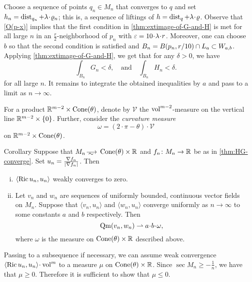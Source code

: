 Choose a sequence of points $q_n\in M_n$ that converges to $q$ and set $h_n\zz=\dist_{q_n}+\lambda\cdot \rho_n$;
this is, a sequence of liftings of $h=\dist_q+\lambda\cdot \rho$. 
Observe that \ref{O(p-x)} implies that the first condition in \ref{thm:extimage-of-G-and-H} is met for all large $n$ in an $\tfrac r2$-neighborhood of $p_n$ with $\eps=10\cdot\lambda\cdot r$.
Moreover, one can choose $b$ so that the second condition is satisfied and $B_n=B(p_n,r/10)\cap L_a\zz\subset W_{a,b}$.
Applying \ref{thm:extimage-of-G-and-H}, we get that for any $\delta>0$, we have 
\[
\int_{B_n}G_n<\delta,
\quad\text{and}\quad
\int_{B_n}H_n<\delta.
\]
for all large $n$.
It remains to integrate the obtained inequalities by $a$ and pass to a limit as $n\to\infty$.
\qeds

For a product $\mathbb{R}^{m-2}\times \operatorname{Cone}(\theta)$, denote by $\mathcal{V}$ the $\operatorname{vol}^{m-2}$-measure on the vertical line $\mathbb{R}^{m-2}\times \{0\}$.
Further, consider the \emph{curvature measure} 
\[\omega=(2\cdot\pi-\theta)\cdot \mathcal{V}\]
on $\mathbb{R}^{m-2}\times \operatorname{Cone}(\theta)$. 


\begin{thm}{Corollary}\label{cor:Ricci}
Suppose that $M_n\smooths{}  \Cone(\theta)\times \RR$ and $f_n\colon M_n\to \mathbb{R}$ be as in \ref{thm:HG-converge}.
Set $u_n\zz=\tfrac{\nabla f_n}{|\nabla f_n|}$.
Then 

\begin{enumerate}[(i)]
\item\label{cor:Ricci:Ricci} $\langle \operatorname{\rm Ric} u_n,u_n\rangle$ weakly converges to zero.
\item\label{cor:Ricci:vw}
Let $v_n$ and $w_n$ are sequences of uniformly bounded, continuous vector fields on $M_n$.
Suppose that $\langle v_n,u_n\rangle$ and $\langle w_n,u_n\rangle$ converge uniformly as $n\to \infty$ to some constants $a$ and $b$ respectively.
Then 
\[\Qm(v_n,w_n)\rightharpoonup a\cdot b\cdot \omega,\]
where $\omega$ is the measure on $\operatorname{Cone}(\theta)\times \mathbb{R}$  described above.

\end{enumerate}

\end{thm}

Passing to a subsequence if necessary, we can assume weak convergence $\langle \Ric u_n,u_n\rangle\zz\cdot\vol^m$ to a measure $\mu$ on $\operatorname{Cone}(\theta)\times \mathbb{R}$.
Since $\sec M_n\ge -\tfrac1n$, we have that $\mu\ge 0$.
Therefore it is sufficient to show that $\mu\le 0$.

